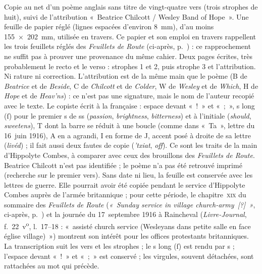 Copie au net d'un poème anglais sans titre de vingt-quatre vers (trois strophes de huit), suivi de l'attribution «~Beatrice Chilcott / Wesley Band of Hope~». Une feuille de papier réglé (lignes espacées d'environ 8~mm), d'au moins 155~×~202~mm, utilisée en travers. Ce papier et son emploi en travers rappellent les trois feuillets réglés des \textit{Feuillets de Route} (ci-après, p.~\pageref{annexe:doc6}) : ce rapprochement ne suffit pas à prouver une provenance du même cahier. Deux pages écrites, très probablement le recto et le verso : strophes 1 et 2, puis strophe 3 et l'attribution. Ni rature ni correction. L'attribution est de la même main que le poème (B de \textit{Beatrice} et de \textit{Beside}, C de \textit{Chilcott} et de \textit{Colder}, W de \textit{Wesley} et de \textit{Which}, H de \textit{Hope} et de \textit{Heav'ns}) : ce n'est pas une signature, mais le nom de l'auteur recopié avec le texte. Le copiste écrit à la française : espace devant «~!~» et «~;~», s long (ſ) pour le premier s de ss (\textit{passion}, \textit{brightness}, \textit{bitterness}) et à l'initiale (\textit{should}, \textit{sweetens}), T dont la barre se réduit à une boucle (comme dans «~Ta~», lettre du 16~juin 1916), A en a agrandi, I en forme de J, accent posé à droite de sa lettre (\textit{livéd}) ; il fait aussi deux fautes de copie (\textit{'txiat}, \textit{off}). Ce sont les traits de la main d'Hippolyte Combes, à comparer avec ceux des brouillons des \textit{Feuillets de Route}. Beatrice Chilcott n'est pas identifiée ; le poème n'a pas été retrouvé imprimé (recherche sur le premier vers). Sans date ni lieu, la feuille est conservée avec les lettres de guerre. Elle pourrait avoir été copiée pendant le service d'Hippolyte Combes auprès de l'armée britannique ; pour cette période, le chapitre~\textsc{xix} du sommaire des \textit{Feuillets de Route} (\textit{«~Sunday service in village church-army~\textup{[?]}~»}, ci-après, p.~\pageref{annexe:doc6-xix}) et la journée du 17~septembre 1916 à Raincheval (\textit{Livre-Journal}, f.~22~v\textsuperscript{o}, l.~17--18 : «~assisté church service (Wesleyans dans petite salle en face église village)~») montrent son intérêt pour les offices protestants britanniques. La transcription suit les vers et les strophes ; le s long (ſ) est rendu par s ; l'espace devant «~!~» et «~;~» est conservé ; les virgules, souvent détachées, sont rattachées au mot qui précède.

